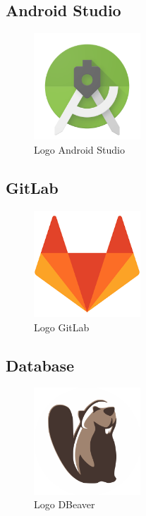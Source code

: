 \subsection{Android Studio}

\begin{figure}[htbp]	
	\centering
	\includegraphics[width=4cm]{immagini/logoandroidstudio.png}
	\caption{Logo Android Studio}
	\label{fig:Logo Android Studio}
\end{figure}

\subsection{GitLab}

\begin{figure}[htbp]	
	\centering
	\includegraphics[width=4cm]{immagini/logogitlab.png}
	\caption{Logo GitLab}
	\label{fig:Logo GitLab}
\end{figure}

\subsection{Database}

\begin{figure}[htbp]	
	\centering
	\includegraphics[width=4cm]{immagini/logodbeaver.png}
	\caption{Logo DBeaver}
	\label{fig:Logo DBeaver}
\end{figure}

